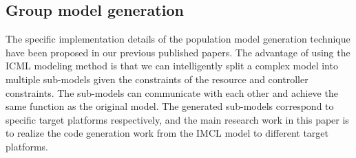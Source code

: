 \subsection{Group model generation}

The specific implementation details of the population model generation technique have been proposed in our previous published papers. The advantage of using the ICML modeling method is that we can intelligently split a complex model into multiple sub-models given the constraints of the resource and controller constraints. The sub-models can communicate with each other and achieve the same function as the original model. The generated sub-models correspond to specific target platforms respectively, and the main research work in this paper is to realize the code generation work from the IMCL model to different target platforms.

